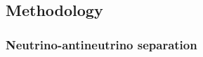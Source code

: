 \documentclass[a4paper,11pt]{article}
\begin{document}

\subsection{Methodology}
\vspace{0.1 cm}






\subsubsection{Neutrino-antineutrino separation}
\end{document}
